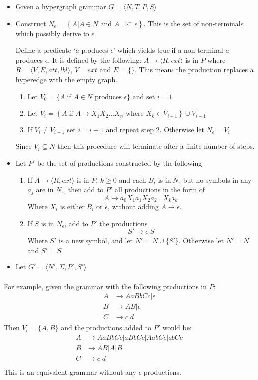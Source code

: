 \begin{itemize}
\item Given a hypergraph grammar $G = \langle N, T, P, S \rangle$
\item Construct $N_\epsilon = \left\{A | A \in N \textrm{ and } A \Rightarrow^{+} \epsilon \right\}$. This is the set of non-terminals which possibly derive to $\epsilon$.

Define a predicate `$a$ produces $\epsilon$' which yields true if a non-terminal $a$ produces $\epsilon$. It is defined by the following: $A \to \langle R, ext \rangle$ is in $P$ where $R = \langle V, E, att, lbl\rangle$, $V = ext$ and $E = \{\}$. This means the production replaces a hyperedge with the empty graph.
\begin{enumerate}
\item Let $V_0 = \{A| \textrm{if $A \in N$ produces $\epsilon$}\}$ and set $i = 1$
\item Let $V_i = \left\{A| \textrm{if } A \to X_1X_2\dots X_n \textrm{ where } X_k \in V_{i-1}\right\} \cup V_{i-1}$
\item If $V_i \neq V_{i-1}$ set $i=i+1$ and repeat step 2. Otherwise let $N_\epsilon = V_i$
\end{enumerate}
Since $V_i \subseteq N$ then this procedure will terminate after a finite number of steps.
\item Let $P'$ be the set of productions constructed by the following
\begin{enumerate}
\item If $A \to \langle R, ext \rangle$ is in $P$, $k \geq 0$ and each $B_i$ is in $N_\epsilon$ but no symbols in any $a_j$ are in $N_\epsilon$, then add to $P'$ all productions in the form of
\[
A \to a_0 X_1 a_1 X_2 a_2 \dots X_k a_k
\]
Where $X_i$ is either $B_i$ or $\epsilon$, without adding $A \to \epsilon$.
\item If $S$ is in $N_\epsilon$, add to $P'$ the productions
\[S' \to \epsilon|S\]
Where $S'$ is a new symbol, and let $N' = N \cup \{S'\}$. Otherwise let $N' = N$ and $S' = S$
\end{enumerate}
\item Let $G' = \langle N', \Sigma, P', S' \rangle$
\end{itemize}

\paragraph{}

For example, given the grammar with the following productions in $P$:
\begin{align*}
A &\to AaBbCc | \epsilon \\
B &\to AB | \epsilon \\
C &\to c | d
\end{align*}
Then $V_\epsilon = \{A, B\}$ and the productions added to $P'$ would be:
\begin{align*}
A &\to AaBbCc | aBbCc | AabCc | abCc \\
B &\to AB | A | B \\
C &\to c | d \\
\end{align*}
This is an equivalent grammar without any $\epsilon$ productions.

